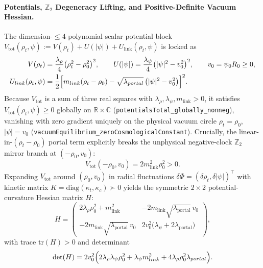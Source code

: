 \paragraph{Potentials, $\mathbb{Z}_2$ Degeneracy Lifting, and Positive-Definite Vacuum Hessian.}
The dimension-$\le 4$ polynomial scalar potential block $V_{\mathrm{tot}}(\rho_t,\psi) := V(\rho_t) + U(|\psi|) + U_{\mathrm{link}}(\rho_t,\psi)$ is locked as
\begin{align}
V(\rho_t) &= \frac{\lambda_\rho}{4}\bigl(\rho_t^2 - \rho_0^2\bigr)^2,
\qquad
U(|\psi|) = \frac{\lambda_\psi}{4}\bigl(|\psi|^2 - v_0^2\bigr)^2,
\qquad v_0 = \psi_0 R_0 \ge 0, \label{eq:V_U_canonical}\\
U_{\mathrm{link}}(\rho_t,\psi) &= \frac{1}{2}\Bigl[m_{\mathrm{link}}(\rho_t - \rho_0) - \sqrt{\lambda_{\mathrm{portal}}}\,\bigl(|\psi|^2 - v_0^2\bigr)\Bigr]^2.
\label{eq:U_link_canonical}
\end{align}
Because $V_{\mathrm{tot}}$ is a sum of three real squares with $\lambda_\rho, \lambda_\psi, m_{\mathrm{link}} > 0$, it satisfies $V_{\mathrm{tot}}(\rho_t,\psi) \ge 0$ globally on $\mathbb{R}\times\mathbb{C}$ (\texttt{potentialsTotal\_globally\_nonneg}), vanishing with zero gradient uniquely on the physical vacuum circle $\rho_t = \rho_0$, $|\psi| = v_0$ (\texttt{vacuumEquilibrium\_zeroCosmologicalConstant}). Crucially, the linear-in-$(\rho_t - \rho_0)$ portal term explicitly breaks the unphysical negative-clock $\mathbb{Z}_2$ mirror branch at $(-\rho_0, v_0)$:
\begin{equation}
V_{\mathrm{tot}}(-\rho_0, v_0) = 2 m_{\mathrm{link}}^2 \rho_0^2 > 0.
\label{eq:Z2_lifting_gap}
\end{equation}
Expanding $V_{\mathrm{tot}}$ around $(\rho_0, v_0)$ in radial fluctuations $\delta\Phi = (\delta\rho_t, \delta|\psi|)^\top$ with kinetic matrix $K = \mathrm{diag}(\kappa_t, \kappa_c) \succ 0$ yields the symmetric $2\times 2$ potential-curvature Hessian matrix $H$:
\begin{equation}
H = \begin{pmatrix}
2\lambda_\rho\rho_0^2 + m_{\mathrm{link}}^2 & -2 m_{\mathrm{link}}\sqrt{\lambda_{\mathrm{portal}}}\,v_0 \\[0.4em]
-2 m_{\mathrm{link}}\sqrt{\lambda_{\mathrm{portal}}}\,v_0 & 2 v_0^2\bigl(\lambda_\psi + 2\lambda_{\mathrm{portal}}\bigr)
\end{pmatrix},
\label{eq:radial_Hessian_sec5}
\end{equation}
with trace $\mathrm{tr}(H) > 0$ and determinant
\begin{equation}
\det(H) = 2 v_0^2\Bigl(2\lambda_\rho\lambda_\psi\rho_0^2 + \lambda_\psi m_{\mathrm{link}}^2 + 4\lambda_\rho\rho_0^2\lambda_{\mathrm{portal}}\Bigr).
\label{eq:det_H_positive}
\end{equation}

